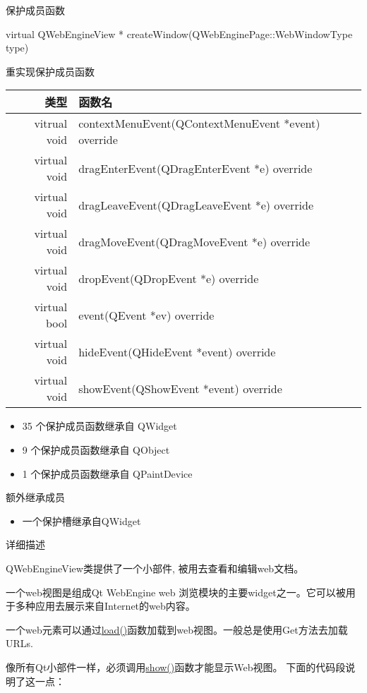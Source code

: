 保护成员函数


virtual QWebEngineView * createWindow(QWebEnginePage::WebWindowType type)

重实现保护成员函数

\begin{tabular}{|r|l|}
	\hline
	类型&  函数名\\
	\hline
vitrual void&	contextMenuEvent(QContextMenuEvent *event) override\\
	\hline
virtual void&	dragEnterEvent(QDragEnterEvent *e) override\\
	\hline
virtual void&	dragLeaveEvent(QDragLeaveEvent *e) override\\
	\hline
virtual void&	dragMoveEvent(QDragMoveEvent *e) override\\
	\hline
virtual void&	dropEvent(QDropEvent *e) override\\
	\hline
virtual bool&	event(QEvent *ev) override\\
	\hline
virtual void&	hideEvent(QHideEvent *event) override\\
	\hline
virtual void&	showEvent(QShowEvent *event) override \\
	\hline
\end{tabular}

\begin{itemize}
\item 35 个保护成员函数继承自 QWidget	
\item 9 个保护成员函数继承自 QObject	
\item 1 个保护成员函数继承自 QPaintDevice
\end{itemize}

额外继承成员

\begin{itemize}
	\item 一个保护槽继承自QWidget
\end{itemize}

详细描述

QWebEngineView类提供了一个小部件, 被用去查看和编辑web文档。

一个web视图是组成Qt WebEngine web 浏览模块的主要widget之一。它可以被用于多种应用去展示来自Internet的web内容。

一个web元素可以通过\href{https://github.com/QtDocumentCN/QtDocumentCN/blob/master/Src/W/QWebEngineView}{load()}函数加载到web视图。一般总是使用Get方法去加载URLs.

像所有Qt小部件一样，必须调用\href{https://github.com/QtDocumentCN/QtDocumentCN/blob/master/Src/W/QWebEngineView}{show()}函数才能显示Web视图。 下面的代码段说明了这一点：

